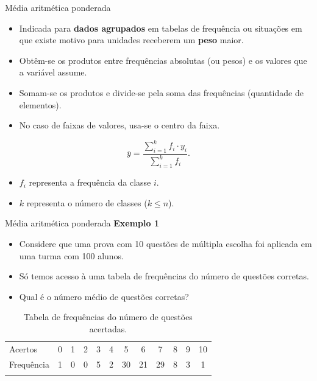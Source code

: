 \documentclass[
  ignorenonframetext,
  serif,
  professionalfont,
  usenames,
  dvipsnames,
  aspectratio = 169]{beamer}
\providecommand{\tightlist}{%
  \setlength{\itemsep}{0pt}\setlength{\parskip}{0pt}}
\renewcommand{\tightlist}{%
  \setlength{\itemsep}{0\baselineskip}
  \setlength{\parskip}{0.25\baselineskip}
}
\begin{document}
\begin{frame}{Média aritmética ponderada}
\label{muxe9dia-aritmuxe9tica-ponderada}
\begin{itemize}
\tightlist
\item
  Indicada para \textbf{dados agrupados} em tabelas de frequência ou
  situações em que existe motivo para unidades receberem um
  \textbf{peso} maior.
\item
  Obtêm-se os produtos entre frequências absolutas (ou pesos) e os
  valores que a variável assume.
\item
  Somam-se os produtos e divide-se pela soma das frequências (quantidade
  de elementos).
\item
  No caso de faixas de valores, usa-se o centro da faixa.
\end{itemize}

\[
\overline{y} = \dfrac{\sum_{i = 1}^{k} f_i \cdot y_i}{\sum_{i = 1}^{k} f_i}.
\]

\begin{itemize}
\tightlist
\item
  \(f_i\) representa a frequência da classe \(i\).
\item
  \(k\) representa o número de classes (\(k \leq n\)).
\end{itemize}
\end{frame}

\begin{frame}{Média aritmética ponderada}
\label{muxe9dia-aritmuxe9tica-ponderada-1}
\textbf{Exemplo 1}

\begin{itemize}
\item
  Considere que uma prova com 10 questões de múltipla escolha foi
  aplicada em uma turma com 100 alunos.
\item
  Só temos acesso à uma tabela de frequências do número de questões
  corretas.
\item
  Qual é o número médio de questões corretas?
\end{itemize}

\begin{longtable}[]{@{}lccccccccccc@{}}
\caption{Tabela de frequências do número de questões
acertadas.}\tabularnewline
\toprule\noalign{}
\endfirsthead
\endhead
Acertos & 0 & 1 & 2 & 3 & 4 & 5 & 6 & 7 & 8 & 9 & 10 \\
Frequência & 1 & 0 & 0 & 5 & 2 & 30 & 21 & 29 & 8 & 3 & 1 \\
\bottomrule\noalign{}
\end{longtable}
\end{frame}
\end{document}

